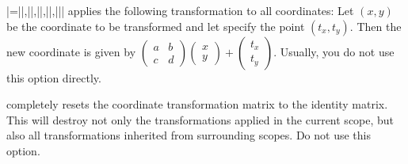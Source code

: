 \begin{itemize}
  |={||,||,||,||,||}|
  applies the following transformation to all coordinates: Let $(x,y)$
  be the coordinate to be transformed and let 
  specify the point $(t_x,t_y)$. Then the new coordinate is given by
  $\left(\begin{smallmatrix} a & b \\ c & d\end{smallmatrix}\right)
  \left(\begin{smallmatrix} x \\ y \end{smallmatrix}\right) +
  \left(\begin{smallmatrix} t_x \\ t_y
  \end{smallmatrix}\right)$. Usually, you do not use this option
  directly. 
\begin{codeexample}[]
\end{codeexample}

  completely resets the coordinate transformation matrix to the
  identity matrix. This will destroy not only the transformations
  applied in the current scope, but also all transformations inherited
  from surrounding scopes. Do not use this option.
\end{itemize}


